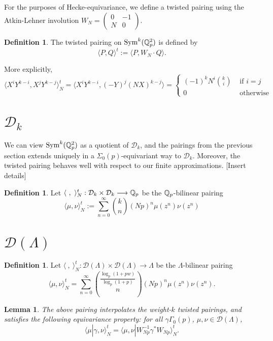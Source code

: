 \documentclass[12pt]{article}
\newtheorem{lem}[thm]{Lemma}
\theoremstyle{definition}
\newtheorem{defn}[thm]{Definition}
\def\cD{{\mathcal D}}
\def\Q{{\Bbb Q}}
\def\Sym{\operatorname{Sym}}
\begin{document}
For the purposes of Hecke-equivariance, we define a twisted pairing using the Atkin-Lehner involution $W_N = \begin{pmatrix} 0 & -1 \\ N & 0 \end{pmatrix}$.
\begin{defn}
The twisted pairing on $\Sym^k(\Q_p^2)$ is defined by
\begin{equation}
	\langle P, Q\rangle^t := \langle P, W_N \cdot Q\rangle.
\end{equation}
\end{defn}
More explicitly,
\begin{equation*}
	\langle X^iY^{k-i}, X^j Y^{k-j} \rangle_N^t = \langle X^i Y^{k-i}, (-Y)^j(NX)^{k-j}\rangle= \begin{cases} (-1)^k N^i {k \choose i} & \text{ if } i=j\\
												0	& \text{ otherwise} \end{cases}
\end{equation*}


\section{$\cD_k$}
We can view $\Sym^k(\Q_p^2)$ as a quotient of $\cD_k$, and the pairings from the previous section extends uniquely in a $\Sigma_0(p)$-equivariant way to $\cD_k$. Moreover, the twisted pairing behaves well with respect to our finite approximations. [Insert details]

\begin{defn}
Let $\langle~,~\rangle^t_N : \cD_k\times\cD_k\longrightarrow \Q_p$ be the $\Q_p$-bilinear pairing
\begin{equation}
	\langle \mu, \nu \rangle_N^t := \sum_{n=0}^\infty {k \choose n} (Np)^n \mu(z^n)\nu(z^n)
\end{equation}
\end{defn}


\section{$\cD(\Lambda)$}

\begin{defn}
Let $\langle ~, ~\rangle^t_N :\cD(\Lambda)\times\cD(\Lambda) \longrightarrow \Lambda$ be the $\Lambda$-bilinear pairing
\begin{equation}
	\langle \mu, \nu \rangle_N^t = \sum_{n=0}^\infty {\frac{\log_p(1+pw)}{\log_p(1+p)} \choose n} (Np)^n \mu(z^n)\nu(z^n).
\end{equation}
\end{defn}

\begin{lem}
The above pairing interpolates the weight-$k$ twisted pairings, and satisfies the following equivariance property: for all $\gamma \Gamma_0(p)$, $\mu,\nu\in \cD(\Lambda)$, 
\begin{equation}
	\langle \mu | \gamma, \nu\rangle_N^t  = \langle \mu, \nu| W_{Np}^{-1}\gamma^* W_{Np}\rangle_N^t.
\end{equation}	
\end{lem}
\end{document}
